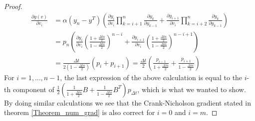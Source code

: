\begin{proof}
\begin{align*}
\frac{\partial g(v)}{\partial v_i} &= \alpha(y_n-y^T)(\frac{\partial y_{i}}{\partial v_{i}}\prod_{k=i+1}^{n}\frac{\partial y_k}{\partial y_{k-1}} +\frac{\partial y_{i+1}}{\partial v_{i}}\prod_{k=i+2}^{n}\frac{\partial y_k}{\partial y_{k-1}}) \\
&= p_n(\frac{\partial y_{i}}{\partial v_{i}}(\frac{1+\frac{\Delta ta }{2}}{1-\frac{\Delta ta }{2}})^{n-i}+\frac{\partial y_{i+1}}{\partial v_{i}}(\frac{1+\frac{\Delta ta }{2}}{1-\frac{\Delta ta }{2}})^{n-i+1}) \\
&=\frac{\Delta t}{2(1-\frac{\Delta t a}{2})}(p_i+p_{i+1}) = \frac{\Delta t}{2}(\frac{p_{i-1}}{1+ \frac{\Delta t a}{2}}+\frac{p_{i+1}}{1- \frac{\Delta t a}{2}})
\end{align*}
For $i=1,...,n-1$, the last expression of the above calculation is equal to the $i$-th component of $ \frac{1}{2}( \frac{1}{1+\frac{\Delta t a}{2}} B+\frac{1}{1-\frac{\Delta t a}{2}}B^T)p_{\Delta t}$, which is what we wanted to show. By doing similar calculations we see that the Crank-Nicholson gradient stated in theorem \ref{Theorem_num_grad} is also correct for $i=0$ and $i=m$.
\end{proof}
